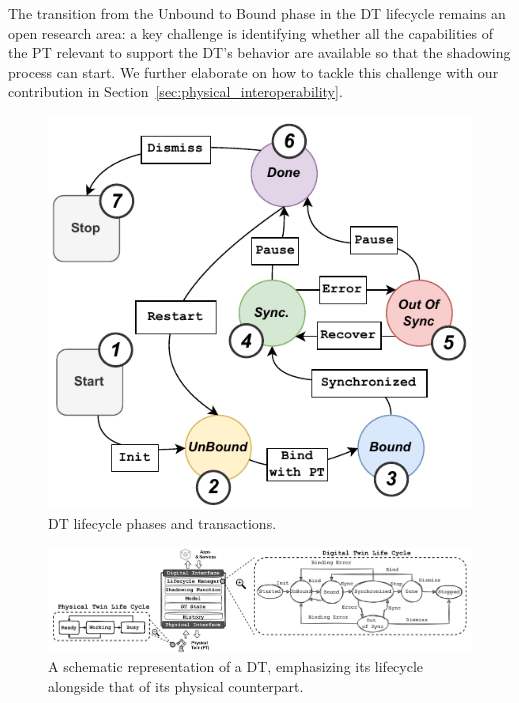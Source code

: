 The transition from the Unbound to Bound phase in the \ac{DT} lifecycle remains an open research area:
a key challenge is identifying whether all the capabilities of the \ac{PT} relevant to support the \ac{DT}'s behavior are available so that the shadowing process can start.
We further elaborate on how to tackle this challenge with our contribution in Section~\ref{sec:physical_interoperability}.

\begin{figure}[ht]
    \setlength{\belowcaptionskip}{-13pt}
    \centering
    \includegraphics[width=0.8\linewidth]{figures/dt-interoperability/dt-lifecycle.pdf}
    \caption{\acl{DT} lifecycle phases and transactions.}
    \label{fig:lifecycle}
\end{figure}

\begin{figure}[t]
    \setlength{\belowcaptionskip}{-13pt}
    \centering
    \includegraphics[width=\textwidth]{figures/dt-lifecycle/dt_model_lifecycle_dt_pt.pdf}
    \caption{A schematic representation of a DT, emphasizing its lifecycle alongside that of its physical counterpart.}
    \label{fig:dt_model_pt_dt_lifecycles}
\end{figure}


